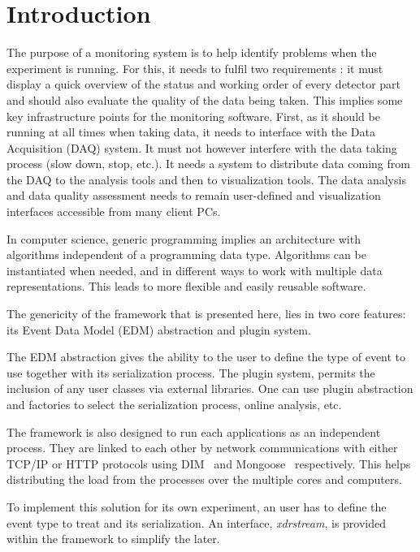 \documentclass[conference]{IEEEtran}
\begin{document}

\section{Introduction}
The purpose of a monitoring system is to help identify problems when the experiment is running. For this, it needs to fulfil two requirements : it must display a quick overview of the status and working order of every detector part and should also evaluate the quality of the data being taken. This implies some key infrastructure points for the monitoring software. First, as it should be running at all times when taking data, it needs to interface with the Data Acquisition (DAQ) system. It must not however interfere with the data taking process (slow down, stop, etc.). It needs a system to distribute data coming from the DAQ to the analysis tools and then to visualization tools. The data analysis and data quality assessment needs to remain user-defined and visualization interfaces accessible from many client PCs.

In computer science, generic programming implies an architecture with algorithms independent of a programming data type. Algorithms can be instantiated when needed, and in different ways to work with multiple data representations. This leads to more flexible and easily reusable software.

The genericity of the framework that is presented here, lies in two core features: its Event Data Model (EDM) abstraction and plugin system.

The EDM abstraction gives the ability to the user to define the type of event to use together with its serialization process. The plugin system, permits the inclusion of any user classes via external libraries. One can use plugin abstraction and factories to select the serialization process, online analysis, etc.

The framework is also designed to run each applications as an independent process. They are linked to each other by network communications with either TCP/IP or HTTP protocols using DIM~\cite{DIM} and Mongoose~\cite{MONGOOSE} respectively. This helps distributing the load from the processes over the multiple cores and computers.

To implement this solution for its own experiment, an user has to define the event type to treat and its serialization. An interface, \textit{xdrstream}, is provided within the framework to simplify the later.
\end{document}
